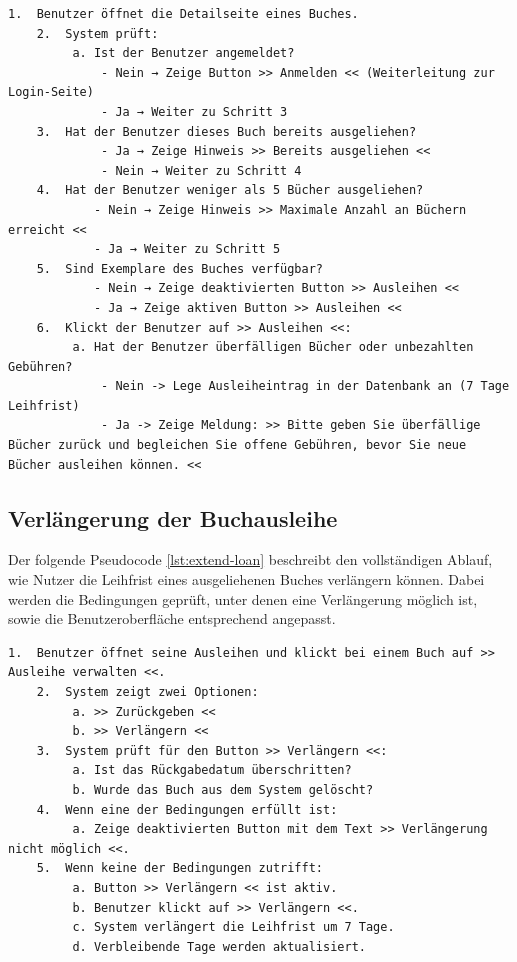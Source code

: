 \begin{lstlisting}[style=pseudocode, caption={Pseudocode für den Ausleihvorgang eines Buches}, label={lst:buchausleihe}]
	1.  Benutzer öffnet die Detailseite eines Buches.
	2.  System prüft:
	     a. Ist der Benutzer angemeldet?
	         - Nein → Zeige Button >> Anmelden << (Weiterleitung zur Login-Seite)
	         - Ja → Weiter zu Schritt 3
	3.  Hat der Benutzer dieses Buch bereits ausgeliehen?
	         - Ja → Zeige Hinweis >> Bereits ausgeliehen <<
	         - Nein → Weiter zu Schritt 4
	4.  Hat der Benutzer weniger als 5 Bücher ausgeliehen?
	        - Nein → Zeige Hinweis >> Maximale Anzahl an Büchern erreicht <<
	        - Ja → Weiter zu Schritt 5
	5.  Sind Exemplare des Buches verfügbar?
         	- Nein → Zeige deaktivierten Button >> Ausleihen <<
	        - Ja → Zeige aktiven Button >> Ausleihen <<
	6.  Klickt der Benutzer auf >> Ausleihen <<:
	     a. Hat der Benutzer überfälligen Bücher oder unbezahlten Gebühren?
	         - Nein -> Lege Ausleiheintrag in der Datenbank an (7 Tage Leihfrist) 
	         - Ja -> Zeige Meldung: >> Bitte geben Sie überfällige Bücher zurück und begleichen Sie offene Gebühren, bevor Sie neue Bücher ausleihen können. <<
\end{lstlisting}


\subsection{Verlängerung der Buchausleihe}

Der folgende Pseudocode \ref{lst:extend-loan} beschreibt den vollständigen Ablauf, wie Nutzer die Leihfrist eines ausgeliehenen Buches verlängern können. Dabei werden die Bedingungen geprüft, unter denen eine Verlängerung möglich ist, sowie die Benutzeroberfläche entsprechend angepasst.

\begin{lstlisting}[style=pseudocode, caption={Pseudocode für die Verlängerung einer Buchausleihe}, label={lst:extend-loan}]
	1.  Benutzer öffnet seine Ausleihen und klickt bei einem Buch auf >> Ausleihe verwalten <<.
	2.  System zeigt zwei Optionen:
	     a. >> Zurückgeben <<
	     b. >> Verlängern <<
	3.  System prüft für den Button >> Verlängern <<:
	     a. Ist das Rückgabedatum überschritten?
	     b. Wurde das Buch aus dem System gelöscht?
	4.  Wenn eine der Bedingungen erfüllt ist:
	     a. Zeige deaktivierten Button mit dem Text >> Verlängerung nicht möglich <<.
	5.  Wenn keine der Bedingungen zutrifft:
	     a. Button >> Verlängern << ist aktiv.
	     b. Benutzer klickt auf >> Verlängern <<.
	     c. System verlängert die Leihfrist um 7 Tage.
	     d. Verbleibende Tage werden aktualisiert.
\end{lstlisting}

























